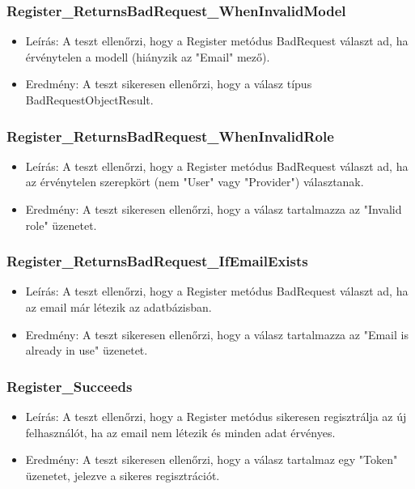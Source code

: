 \documentclass[11pt]{article}
\begin{document}
\subsubsection{Register\_ReturnsBadRequest\_WhenInvalidModel}
\label{sec:org4c4d5a0}
\begin{itemize}
\item Leírás: A teszt ellenőrzi, hogy a Register metódus BadRequest választ ad, ha érvénytelen a modell (hiányzik az "Email" mező).
\item Eredmény: A teszt sikeresen ellenőrzi, hogy a válasz típus BadRequestObjectResult.
\end{itemize}
\subsubsection{Register\_ReturnsBadRequest\_WhenInvalidRole}
\label{sec:orgaba1ac5}
\begin{itemize}
\item Leírás: A teszt ellenőrzi, hogy a Register metódus BadRequest választ ad, ha az érvénytelen szerepkört (nem "User" vagy "Provider") választanak.
\item Eredmény: A teszt sikeresen ellenőrzi, hogy a válasz tartalmazza az "Invalid role" üzenetet.
\end{itemize}
\subsubsection{Register\_ReturnsBadRequest\_IfEmailExists}
\label{sec:orge581060}
\begin{itemize}
\item Leírás: A teszt ellenőrzi, hogy a Register metódus BadRequest választ ad, ha az email már létezik az adatbázisban.
\item Eredmény: A teszt sikeresen ellenőrzi, hogy a válasz tartalmazza az "Email is already in use" üzenetet.
\end{itemize}
\subsubsection{Register\_Succeeds}
\label{sec:org9e882ff}
\begin{itemize}
\item Leírás: A teszt ellenőrzi, hogy a Register metódus sikeresen regisztrálja az új felhasználót, ha az email nem létezik és minden adat érvényes.
\item Eredmény: A teszt sikeresen ellenőrzi, hogy a válasz tartalmaz egy "Token" üzenetet, jelezve a sikeres regisztrációt.
\end{itemize}
\end{document}

